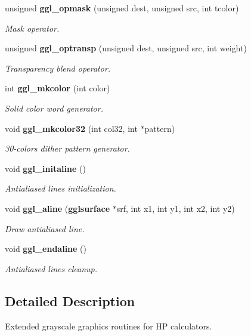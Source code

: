 \begin{CompactItemize}
unsigned {\bf ggl\_\-opmask} (unsigned dest, unsigned src, int tcolor)
\begin{CompactList}\small\item\em Mask operator. \item\end{CompactList}\item 
unsigned {\bf ggl\_\-optransp} (unsigned dest, unsigned src, int weight)
\begin{CompactList}\small\item\em Transparency blend operator. \item\end{CompactList}\item 
int {\bf ggl\_\-mkcolor} (int color)
\begin{CompactList}\small\item\em Solid color word generator. \item\end{CompactList}\item 
void {\bf ggl\_\-mkcolor32} (int col32, int $\ast$pattern)
\begin{CompactList}\small\item\em 30-colors dither pattern generator. \item\end{CompactList}\item 
void {\bf ggl\_\-initaline} ()
\begin{CompactList}\small\item\em Antialiased lines initialization. \item\end{CompactList}\item 
void {\bf ggl\_\-aline} ({\bf gglsurface} $\ast$srf, int x1, int y1, int x2, int y2)
\begin{CompactList}\small\item\em Draw antialiased line. \item\end{CompactList}\item 
void {\bf ggl\_\-endaline} ()
\begin{CompactList}\small\item\em Antialiased lines cleanup. \item\end{CompactList}\end{CompactItemize}


\subsection{Detailed Description}
Extended grayscale graphics routines for HP calculators. 



